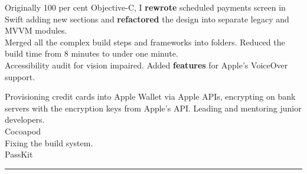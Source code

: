 \documentclass{article}
\begin{document}
Originally 100 per cent Objective-C,  I {\bf rewrote} scheduled payments screen in Swift adding new sections and {\bf refactored} the design into separate legacy and MVVM modules.  \\
Merged all the complex build steps and frameworks into folders. Reduced the build time from 8 minutes to under one minute. \\

Accessibility audit for vision impaired. Added {\bf features} for Apple's VoiceOver support.

Provisioning credit cards into Apple Wallet via Apple APIs, encrypting on bank servers with the encryption keys from Apple's API. Leading and mentoring junior developers. \\
Cocoapod \\
Fixing the build system. \\
PassKit \\

\noindent\hfil\rule{0.5\textwidth}{.4pt}\hfil
\\
\end{document}

